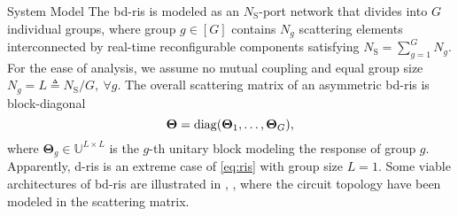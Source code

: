 \documentclass[journal]{IEEEtran}
\begin{document}
\begin{section}{System Model}
		The \gls{bd}-\gls{ris} is modeled as an $N_\mathrm{S}$-port network that divides into $G$ individual groups, where group $g \in [G]$ contains $N_g$ scattering elements interconnected by real-time reconfigurable components \cite{Shen2020a} satisfying $N_\mathrm{S} = \sum_{g=1}^G N_g$.
		For the ease of analysis, we assume no mutual coupling and equal group size $N_g = L \triangleq N_\mathrm{S} / G, \ \forall g$.
		The overall scattering matrix of an asymmetric \gls{bd}-\gls{ris} is block-diagonal
		\begin{equation}
			\label{eq:ris}
			\mathbf{\Theta} = \operatorname{diag}(\mathbf{\Theta}_1,\ldots,\mathbf{\Theta}_G),
		\end{equation}
		where $\mathbf{\Theta}_g \in \mathbb{U}^{L \times L}$ is the $g$-th unitary block modeling the response of group $g$.
		Apparently, \gls{d}-\gls{ris} is an extreme case of \eqref{eq:ris} with group size $L=1$.
		Some viable architectures of \gls{bd}-\gls{ris} are illustrated in \cite[Fig. 3]{Shen2020a}, \cite[Fig. 5]{Li2023c}, \cite[Fig. 2]{Nerini2024} where the circuit topology have been modeled in the scattering matrix.


\end{section}
\end{document}
